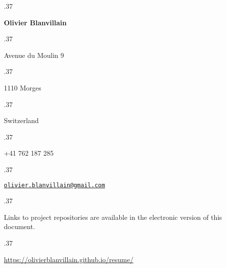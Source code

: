 \documentclass[margin, a4paper]{res}
\let\link\href
\renewcommand{\href}[2]{\link{#1}{\scriptsize{\faExternalLink}}}
\newcommand{\centered}[1]{\moveleft.37\hoffset\centerline{#1}}
\begin{document}
  \centered{\large\textbf{Olivier Blanvillain}}
  \vspace{3pt}
  \centered{Avenue du Moulin 9}
  \centered{1110 Morges}
  \centered{Switzerland}
  \vspace{3pt}
  \centered{+41 762 187 285}
  \centered{\link{mailto:olivier.blanvillain@gmail.com}{\texttt{olivier.blanvillain@gmail.com}}}

  \begin{resume}
    
  \end{resume}

  \vspace{25pt}

  \centered{\footnotesize Links to project repositories are available in the electronic version of this document.}
  \centered{\footnotesize \url{https://olivierblanvillain.github.io/resume/}}
\end{document}
